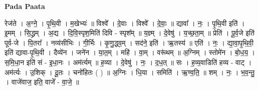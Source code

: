 \documentclass[17pt]{extarticle}
\begin{document}
\textbf{Pada Paata} \newline

रेज॑ते । अ॒ग्ने॒ । पृ॒थि॒वी । म॒खेभ्यः॑ ॥ विश्वे᳚ । दे॒वाः । विश्वे᳚ । दे॒वाः॒ ॥ द्यावा᳚ । नः॒ । पृ॒थि॒वी इति॑ । इ॒मम् । सि॒द्ध्रम् । अ॒द्य । दि॒वि॒स्पृश॒मिति॑ दिवि - स्पृश᳚म् ॥ य॒ज्ञ्म् । दे॒वेषु॑ । य॒च्छ॒ता॒म् ॥ प्रेति॑ । पू॒र्व॒जे इति॑ पूर्व-जे । पि॒तरा᳚ । नव्य॑सीभिः । गी॒र्भिः । कृ॒णु॒द्ध्व॒म् । सद॑ने॒ इति॑ । ऋ॒तस्य॑ ॥ एति॑ । नः॒ । द्या॒वा॒पृ॒थि॒वी॒ इति॑ द्यावा-पृ॒थि॒वी । दैव्ये॑न । जने॑न । या॒त॒म् । महि॑ । वा॒म् । वरू॑थम् ॥ अ॒ग्निम् । स्तोमे॑न । बो॒ध॒य॒ । स॒मि॒धा॒न इति॑ सं - इ॒धा॒नः । अम॑र्त्यम् ॥ ह॒व्या । दे॒वेषु॑ । नः॒ । द॒ध॒त् ॥ सः । ह॒व्य॒वाडिति॑ हव्य - वाट् । अम॑र्त्यः । उ॒शिक् । दू॒तः । चनो॑हितः ( ) ॥ अ॒ग्निः । धि॒या । समिति॑ । ऋ॒ण्व॒ति॒ ॥ शम् । नः॒ । भ॒व॒न्तु॒ । वाजे॑वाज॒ इति॒ वाजे᳚ - वा॒जे॒ ॥  \newline
\end{document}

